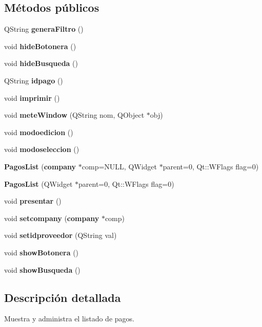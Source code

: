 \subsection*{M\'{e}todos p\'{u}blicos}
\begin{CompactItemize}
\item 
QString {\bf genera\-Filtro} ()\label{classPagosList_a0}

\item 
void {\bf hide\-Botonera} ()\label{classPagosList_a1}

\item 
void {\bf hide\-Busqueda} ()\label{classPagosList_a2}

\item 
QString {\bf idpago} ()\label{classPagosList_a3}

\item 
void {\bf imprimir} ()\label{classPagosList_a4}

\item 
void {\bf mete\-Window} (QString nom, QObject $\ast$obj)\label{classPagosList_a5}

\item 
void {\bf modoedicion} ()\label{classPagosList_a6}

\item 
void {\bf modoseleccion} ()\label{classPagosList_a7}

\item 
{\bf Pagos\-List} ({\bf company} $\ast$comp=NULL, QWidget $\ast$parent=0, Qt::WFlags flag=0)\label{classPagosList_a8}

\item 
{\bf Pagos\-List} (QWidget $\ast$parent=0, Qt::WFlags flag=0)\label{classPagosList_a9}

\item 
void {\bf presentar} ()
\item 
void {\bf setcompany} ({\bf company} $\ast$comp)\label{classPagosList_a11}

\item 
void {\bf setidproveedor} (QString val)\label{classPagosList_a12}

\item 
void {\bf show\-Botonera} ()\label{classPagosList_a13}

\item 
void {\bf show\-Busqueda} ()\label{classPagosList_a14}

\end{CompactItemize}


\subsection{Descripci\'{o}n detallada}
Muestra y administra el listado de pagos. 



